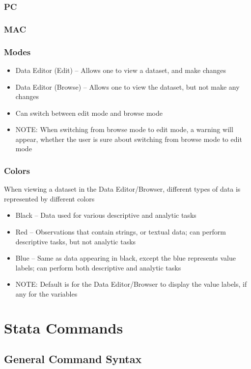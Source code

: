 \documentclass{beamer}
\begin{document}
\begin{frame}
	\frametitle{PC}
\end{frame}

\begin{frame}
	\frametitle{MAC}
\end{frame}

\begin{frame}
	\frametitle{Modes}
		\begin{itemize}
			\item Data Editor (Edit) -- Allows one to view a dataset, and make changes
			\item Data Editor (Browse) -- Allows one to view the dataset, but not make any changes
			\item Can switch between edit mode and browse mode
			\item NOTE: When switching from browse mode to edit mode, a warning will appear, whether the user is sure about switching from browse mode to edit mode
		\end{itemize}
\end{frame}

\begin{frame}
	\frametitle{Colors}
		When viewing a dataset in the Data Editor/Browser, different types of data is represented by different colors
		\begin{itemize}
			\item Black -- Data used for various descriptive and analytic tasks
			\item Red -- Observations that contain strings, or textual data; can perform descriptive tasks, but not analytic tasks
			\item Blue -- Same as data appearing in black, except the blue represents value labels; can perform both descriptive and analytic tasks
			\item NOTE: Default is for the Data Editor/Browser to display the value labels, if any for the variables
		\end{itemize}
\end{frame}

\section{Stata Commands}
\subsection{General Command Syntax}
\end{document}
